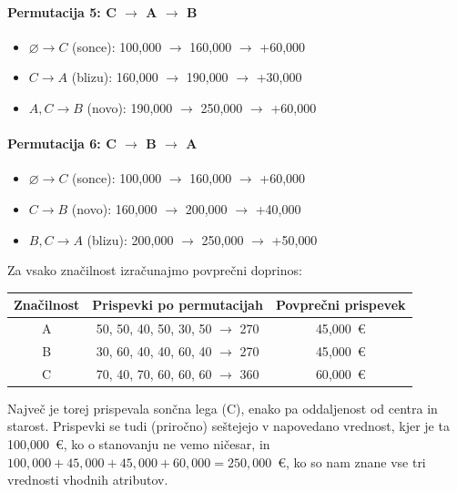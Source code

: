 \paragraph{Permutacija 5: C \(\rightarrow\) A \(\rightarrow\) B}

\begin{itemize}
    \item \(\varnothing \rightarrow C\) (sonce): 100{,}000 \(\rightarrow\) 160{,}000 \(\rightarrow\) +60{,}000
    \item \(C \rightarrow A\) (blizu): 160{,}000 \(\rightarrow\) 190{,}000 \(\rightarrow\) +30{,}000
    \item \(A,C \rightarrow B\) (novo): 190{,}000 \(\rightarrow\) 250{,}000 \(\rightarrow\) +60{,}000
\end{itemize}

\paragraph{Permutacija 6: C \(\rightarrow\) B \(\rightarrow\) A}

\begin{itemize}
    \item \(\varnothing \rightarrow C\) (sonce): 100{,}000 \(\rightarrow\) 160{,}000 \(\rightarrow\) +60{,}000
    \item \(C \rightarrow B\) (novo): 160{,}000 \(\rightarrow\) 200{,}000 \(\rightarrow\) +40{,}000
    \item \(B,C \rightarrow A\) (blizu): 200{,}000 \(\rightarrow\) 250{,}000 \(\rightarrow\) +50{,}000
\end{itemize}

Za vsako značilnost izračunajmo povprečni doprinos:
%
\begin{table}[h]
\centering
\begin{tabular}{ccc}
\toprule
\textbf{Značilnost} & \textbf{Prispevki po permutacijah} & \textbf{Povprečni prispevek} \\
\midrule
A & 50, 50, 40, 50, 30, 50 \(\rightarrow\) 270 & 45{,}000~€ \\
B & 30, 60, 40, 40, 60, 40 \(\rightarrow\) 270 & 45{,}000~€ \\
C & 70, 40, 70, 60, 60, 60 \(\rightarrow\) 360 & 60{,}000~€ \\
\bottomrule
\end{tabular}
\end{table}
%
Največ je torej prispevala sončna lega (C), enako pa oddaljenost od centra in starost. Prispevki se tudi (priročno) seštejejo v napovedano vrednost, kjer je ta 100{,}000~€, ko o stanovanju ne vemo ničesar, in $100{,}000 + 45{,}000 + 45{,}000 + 60{,}000 = 250{,}000$~€, ko so nam znane vse tri vrednosti vhodnih atributov.

